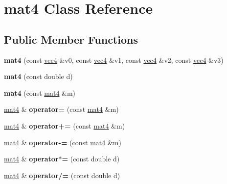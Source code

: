 \hypertarget{classmat4}{
\section{mat4 Class Reference}
\label{classmat4}
}
\subsection*{Public Member Functions}
\begin{DoxyCompactItemize}
\item 
\hypertarget{classmat4_aafb0a8ad2c4ae94ff1a3e6a75f83e31e}{
{\bfseries mat4} (const \hyperlink{classvec4}{vec4} \&v0, const \hyperlink{classvec4}{vec4} \&v1, const \hyperlink{classvec4}{vec4} \&v2, const \hyperlink{classvec4}{vec4} \&v3)}
\label{classmat4_aafb0a8ad2c4ae94ff1a3e6a75f83e31e}

\item 
\hypertarget{classmat4_a7af2f9cda2c7a49d558effd289097f4b}{
{\bfseries mat4} (const double d)}
\label{classmat4_a7af2f9cda2c7a49d558effd289097f4b}

\item 
\hypertarget{classmat4_a77de7784e96322187aa6e2e49fe444ca}{
{\bfseries mat4} (const \hyperlink{classmat4}{mat4} \&m)}
\label{classmat4_a77de7784e96322187aa6e2e49fe444ca}

\item 
\hypertarget{classmat4_ab372a3fd891cf6a3ae659dc82f6ac93d}{
\hyperlink{classmat4}{mat4} \& {\bfseries operator=} (const \hyperlink{classmat4}{mat4} \&m)}
\label{classmat4_ab372a3fd891cf6a3ae659dc82f6ac93d}

\item 
\hypertarget{classmat4_ac8c480dafab0488e1b8a907685903f49}{
\hyperlink{classmat4}{mat4} \& {\bfseries operator+=} (const \hyperlink{classmat4}{mat4} \&m)}
\label{classmat4_ac8c480dafab0488e1b8a907685903f49}

\item 
\hypertarget{classmat4_a1676d34abda52da8b3a0949a9be5bc78}{
\hyperlink{classmat4}{mat4} \& {\bfseries operator-\/=} (const \hyperlink{classmat4}{mat4} \&m)}
\label{classmat4_a1676d34abda52da8b3a0949a9be5bc78}

\item 
\hypertarget{classmat4_a34a656fdb3337ed4407986e29b5d6885}{
\hyperlink{classmat4}{mat4} \& {\bfseries operator$\ast$=} (const double d)}
\label{classmat4_a34a656fdb3337ed4407986e29b5d6885}

\item 
\hypertarget{classmat4_aab7af5a8079a973d779298beace9636b}{
\hyperlink{classmat4}{mat4} \& {\bfseries operator/=} (const double d)}
\label{classmat4_aab7af5a8079a973d779298beace9636b}


\end{DoxyCompactItemize}
